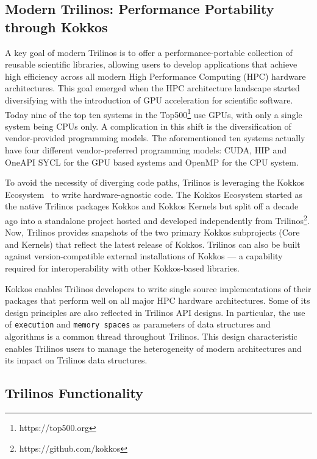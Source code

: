 \subsection{Modern Trilinos:  Performance Portability through Kokkos}


A key goal of modern Trilinos is to offer a performance-portable collection of reusable scientific libraries, allowing users to develop applications that achieve high efficiency across all modern High Performance Computing (HPC) hardware architectures.
This goal emerged when the HPC architecture landscape started diversifying with the
introduction of GPU acceleration for scientific software. Today nine of the top ten systems in the Top500\footnote{https://top500.org} use GPUs, with only a single system being CPUs only. A complication in this shift is the diversification of vendor-provided programming models.
The aforementioned ten systems actually have four different vendor-preferred programming models: CUDA, HIP and OneAPI SYCL for the GPU based systems and OpenMP for the CPU system.

To avoid the necessity of diverging code paths, Trilinos is leveraging the Kokkos Ecosystem~\cite{trott2021kokkos} to write hardware-agnostic code. The Kokkos Ecosystem started as the native Trilinos packages Kokkos and Kokkos Kernels but split off a decade ago into a standalone project hosted and developed independently from Trilinos\footnote{https://github.com/kokkos}.
Now, Trilinos provides snapshots of the two primary Kokkos subprojects (Core and Kernels) that reflect the latest release of Kokkos. Trilinos can also be built against version-compatible external installations of Kokkos --- a capability required for interoperability with other Kokkos-based libraries.

Kokkos enables Trilinos developers to write single source implementations of their packages that perform well on all major HPC hardware architectures. Some of its design principles are also reflected in Trilinos API designs. In particular, the
use of \texttt{execution} and \texttt{memory spaces} as parameters of data structures and algorithms is a common thread throughout Trilinos. This design characteristic enables Trilinos users to manage the heterogeneity of modern architectures and its impact on Trilinos data structures.


\subsection{Trilinos Functionality}

